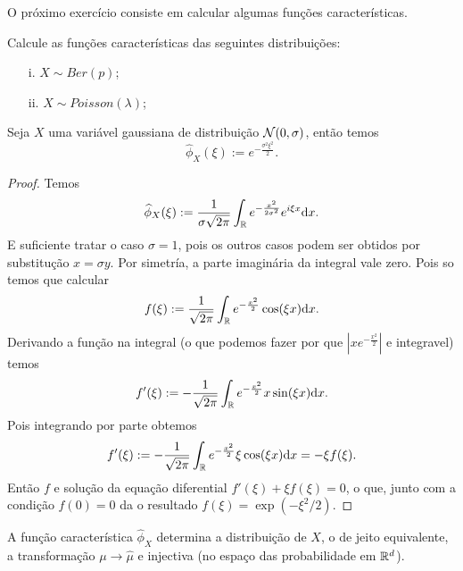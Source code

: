   \par O próximo exercício consiste em calcular algumas funções características.

  \begin{exercise}
    Calcule as funções características das seguintes distribuições:
    \begin{itemize}
    \item[i.] $X \sim Ber(p)$;
    \item[ii.] $X \sim Poisson(\lambda)$;
    \end{itemize}
  \end{exercise}

\medskip

   \begin{lemma}
Seja $X$ uma variável gaussiana de distribuição ${\mathcal N}(0,\sigma)$,
então temos
\begin{equation}
   \hat{\phi}_{X}(\xi):= e^{- \frac{\sigma^2 \xi^2}{2}}.
\end{equation}

  \end{lemma}
  \begin{proof}
  Temos
  \begin{equation}
   \widehat{\phi}_{X}(\xi):=\frac{1}{\sigma \sqrt{2\pi}}\int_{{\mathbb R}} e^{-\frac{x^2}{2\sigma^2}} e^{i\xi x}\mathrm{d} x.
  \end{equation}
E suficiente tratar o caso $\sigma=1$, pois os outros casos podem ser obtidos por substitução $x=\sigma y$.
   Por simetría, a parte imaginária da integral vale zero.
   Pois so temos que calcular
   \begin{equation}
   f(\xi):= \frac{1}{\sqrt{2\pi}}\int_{{\mathbb R}} e^{-\frac{x^2}{2}} \cos(\xi x) \mathrm{d} x.
   \end{equation}
 Derivando a função na integral (o que podemos fazer por que $|x e^{-\frac{x^2}{2}}|$ e integravel) temos
 \begin{equation}
  f'(\xi):=- \frac{1}{\sqrt{2\pi}}\int_{{\mathbb R}} e^{-\frac{x^2}{2}} x \sin(\xi x) \mathrm{d} x.
 \end{equation}
Pois integrando por parte obtemos
 \begin{equation}
  f'(\xi):=- \frac{1}{\sqrt{2\pi}}\int_{{\mathbb R}} e^{-\frac{x^2}{2}} \xi \cos(\xi x) \mathrm{d} x= -\xi f(\xi).
 \end{equation}
   Então $f$ e solução da equação diferential $f'(\xi)+ \xi f(\xi)=0$, o que, junto com a condição $f(0)=0$
   da o resultado $f(\xi)= \exp(-\xi^2/2)$.
  \end{proof}


  \begin{theorem}
   A função característica $\hat \phi_X$ determina a distribuição de $X$, o de jeito equivalente,
   a transformação $\mu \to \hat \mu$ e injectiva (no espaço das probabilidade em ${\mathbb R}^d$).
  \end{theorem}

